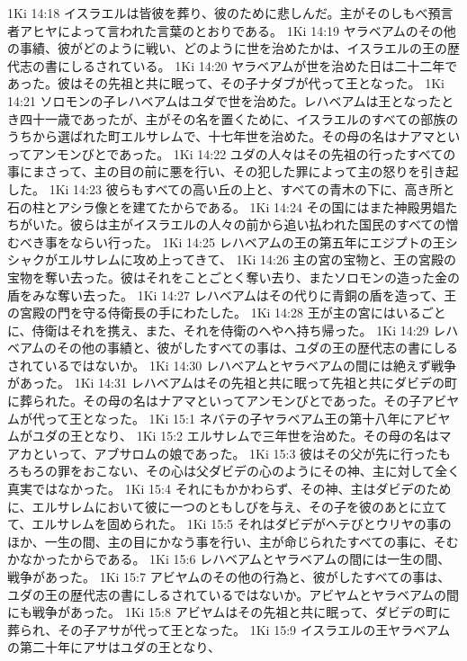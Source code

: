 1Ki 14:18  イスラエルは皆彼を葬り、彼のために悲しんだ。主がそのしもべ預言者アヒヤによって言われた言葉のとおりである。
1Ki 14:19  ヤラベアムのその他の事績、彼がどのように戦い、どのように世を治めたかは、イスラエルの王の歴代志の書にしるされている。
1Ki 14:20  ヤラベアムが世を治めた日は二十二年であった。彼はその先祖と共に眠って、その子ナダブが代って王となった。
1Ki 14:21  ソロモンの子レハベアムはユダで世を治めた。レハベアムは王となったとき四十一歳であったが、主がその名を置くために、イスラエルのすべての部族のうちから選ばれた町エルサレムで、十七年世を治めた。その母の名はナアマといってアンモンびとであった。
1Ki 14:22  ユダの人々はその先祖の行ったすべての事にまさって、主の目の前に悪を行い、その犯した罪によって主の怒りを引き起した。
1Ki 14:23  彼らもすべての高い丘の上と、すべての青木の下に、高き所と石の柱とアシラ像とを建てたからである。
1Ki 14:24  その国にはまた神殿男娼たちがいた。彼らは主がイスラエルの人々の前から追い払われた国民のすべての憎むべき事をならい行った。
1Ki 14:25  レハベアムの王の第五年にエジプトの王シシャクがエルサレムに攻め上ってきて、
1Ki 14:26  主の宮の宝物と、王の宮殿の宝物を奪い去った。彼はそれをことごとく奪い去り、またソロモンの造った金の盾をみな奪い去った。
1Ki 14:27  レハベアムはその代りに青銅の盾を造って、王の宮殿の門を守る侍衛長の手にわたした。
1Ki 14:28  王が主の宮にはいるごとに、侍衛はそれを携え、また、それを侍衛のへやへ持ち帰った。
1Ki 14:29  レハベアムのその他の事績と、彼がしたすべての事は、ユダの王の歴代志の書にしるされているではないか。
1Ki 14:30  レハベアムとヤラベアムの間には絶えず戦争があった。
1Ki 14:31  レハベアムはその先祖と共に眠って先祖と共にダビデの町に葬られた。その母の名はナアマといってアンモンびとであった。その子アビヤムが代って王となった。
1Ki 15:1  ネバテの子ヤラベアム王の第十八年にアビヤムがユダの王となり、
1Ki 15:2  エルサレムで三年世を治めた。その母の名はマアカといって、アブサロムの娘であった。
1Ki 15:3  彼はその父が先に行ったもろもろの罪をおこない、その心は父ダビデの心のようにその神、主に対して全く真実ではなかった。
1Ki 15:4  それにもかかわらず、その神、主はダビデのために、エルサレムにおいて彼に一つのともしびを与え、その子を彼のあとに立てて、エルサレムを固められた。
1Ki 15:5  それはダビデがヘテびとウリヤの事のほか、一生の間、主の目にかなう事を行い、主が命じられたすべての事に、そむかなかったからである。
1Ki 15:6  レハベアムとヤラベアムの間には一生の間、戦争があった。
1Ki 15:7  アビヤムのその他の行為と、彼がしたすべての事は、ユダの王の歴代志の書にしるされているではないか。アビヤムとヤラベアムの間にも戦争があった。
1Ki 15:8  アビヤムはその先祖と共に眠って、ダビデの町に葬られ、その子アサが代って王となった。
1Ki 15:9  イスラエルの王ヤラベアムの第二十年にアサはユダの王となり、

